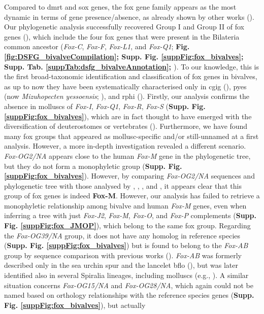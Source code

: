 \documentclass[../main.tex]{subfiles}
\begin{document}
Compared to \gls{dmrt} and \gls{sox} genes, the \gls{fox} gene family appears as the most dynamic in terms of gene presence/absence, as already shown by other works (\textbf{\cite{wu2020identification, seudre2022fox, schomburg2022phylogenetic}}). Our phylogenetic analysis successfully recovered Group I and Group II of \gls{fox} genes (\textbf{\cite{larroux2008genesis}}), which include the four \gls{fox} genes that were present in the Bilateria common ancestor (\textit{Fox-C}, \textit{Fox-F}, \textit{Fox-L1}, and \textit{Fox-Q1}; \textbf{Fig. \ref{fig:DSFG_bivalveCompilation}; Supp. Fig. \ref{suppFig:fox_bivalves}; Supp. Tab. \ref{suppTab:dsfg_bivalveAnnotation}; \cite{shimeld2010clustered}}). To our knowledge, this is the first broad-taxonomic identification and classification of \gls{fox} genes in bivalves, as up to now they have been systematically characterised only in \gls{cgig} (\textbf{\cite{yang2014phylogeny}}), \gls{pyes} (now \textit{Mizuhopecten yessoensis}; \textbf{\cite{wu2020identification}}), and \gls{rphi} (\textbf{\cite{liu2024characterization}}). Firstly, our analysis confirms the absence in molluscs of \textit{Fox-I}, \textit{Fox-Q1}, \textit{Fox-R}, \textit{Fox-S} (\textbf{Supp. Fig. \ref{suppFig:fox_bivalves}}), which are in fact thought to have emerged with the diversification of deuterostomes or vertebrates (\textbf{\cite{yang2014phylogeny, wu2020identification, seudre2022fox, schomburg2022phylogenetic}}). Furthermore, we have found many \gls{fox} groups that appeared as mollusc-specific and/or still-unnamed at a first analysis. However, a more in-depth investigation revealed a different scenario. \textit{Fox-OG2/NA} appears close to the human \textit{Fox-M} gene in the phylogenetic tree, but they do not form a monophyletic group (\textbf{Supp. Fig. \ref{suppFig:fox_bivalves}}). However, by comparing \textit{Fox-OG2/NA} sequences and phylogenetic tree with those analysed by \textbf{\cite{yang2014phylogeny}}, \textbf{\cite{wu2020identification}}, \textbf{\cite{schomburg2022phylogenetic}}, and \textbf{\cite{seudre2022fox}}, it appears clear that this group of \gls{fox} genes is indeed \textbf{Fox-M}. However, our analysis has failed to retrieve a monophyletic relationship among bivalve and human \textit{Fox-M} genes, even when inferring a tree with just \textit{Fox-J2}, \textit{Fox-M}, \textit{Fox-O}, and \textit{Fox-P} complements (\textbf{Supp. Fig. \ref{suppFig:fox_JMOP}}), which belong to the same \gls{fox} group. Regarding the \textit{Fox-OG39/NA} group, it does not have any homolog in reference species (\textbf{Supp. Fig. \ref{suppFig:fox_bivalves}}) but is found to belong to the \textit{Fox-AB} group by sequence comparison with previous works (\textbf{\cite{yang2014phylogeny, wu2020identification, seudre2022fox}}). \textit{Fox-AB} was formerly described only in the sea urchin \gls{spur} and the lancelet \gls{bflo} (\textbf{\cite{tu2006sea,yu2008fox}}), but was later identified also in several Spiralia lineages, including molluscs (e.g., \textbf{\cite{yang2014phylogeny, wu2020identification, seudre2022fox}}). A similar situation concerns \textit{Fox-OG15/NA} and \textit{Fox-OG28/NA}, which again could not be named based on orthology relationships with the reference species genes (\textbf{Supp. Fig. \ref{suppFig:fox_bivalves}}), but actually 
\end{document}
